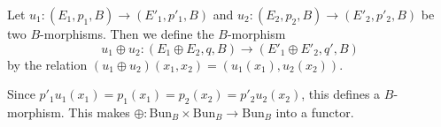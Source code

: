 Let $u_1: (E_1, p_1, B) \to (E'_1, p'_1, B)$ and $u_2: (E_2, p_2, B) \to (E'_2, p'_2, B)$ be two $B$-morphisms. Then we define the $B$-morphism
$$u_1 \oplus u_2: (E_1 \oplus E_2, q, B) \to (E'_1 \oplus E'_2, q', B)$$
by the relation $(u_1 \oplus u_2)(x_1, x_2) = (u_1(x_1), u_2(x_2))$.

Since $p'_1 u_1(x_1) = p_1(x_1) = p_2(x_2) = p'_2 u_2(x_2)$, this defines a $B$-morphism. This makes $\oplus: \text{Bun}_B \times \text{Bun}_B \to \text{Bun}_B$ into a functor.
